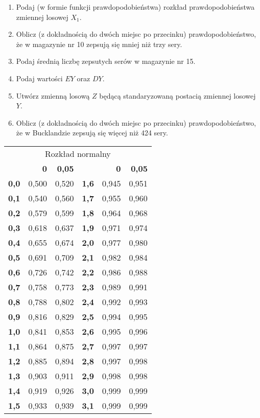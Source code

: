 \documentclass{mwart}
\begin{document}
\begin{enumerate}
\begin{enumerate}
\item Podaj  (w formie funkcji prawdopodobieństwa) rozkład prawdopodobieństwa zmiennej losowej $X_1$.
\item Oblicz (z dokładnością do dwóch miejsc po przecinku) prawdopodobieństwo, że w magazynie nr 10 zepsują się mniej niż trzy sery.
\item Podaj średnią liczbę zepsutych serów w magazynie nr 15.
\item Podaj wartości $EY$ oraz $DY$.
\item Utwórz zmienną losową $Z$ będącą standaryzowaną postacią zmiennej losowej $Y$.
\item Oblicz (z dokładnością do dwóch miejsc po przecinku) prawdopodobieństwo, że w Bucklandzie zepsują się więcej niż 424 sery.
\end{enumerate}


\begin{tabular}{|r|r|r||r|r|r|}
\hline
\multicolumn{6}{|c|}{Rozkład normalny} \\
	& \textbf{0}	& \textbf{0,05}	& 	& \textbf{0}	& \textbf{0,05}\\
\hline
\textbf{0,0}	& 0,500	& 0,520	& \textbf{1,6}	& 0,945	& 0,951 \\
\hline
\textbf{0,1}	& 0,540	& 0,560	& \textbf{1,7}	& 0,955	& 0,960 \\
\hline
\textbf{0,2}	& 0,579	& 0,599	& \textbf{1,8}	& 0,964	& 0,968 \\
\hline
\textbf{0,3}	& 0,618	& 0,637	& \textbf{1,9}	& 0,971	& 0,974 \\
\hline
\textbf{0,4}	& 0,655	& 0,674	& \textbf{2,0}	& 0,977	& 0,980 \\
\hline
\textbf{0,5}	& 0,691	& 0,709	& \textbf{2,1}	& 0,982	& 0,984 \\
\hline
\textbf{0,6}	& 0,726	& 0,742	& \textbf{2,2}	& 0,986	& 0,988 \\
\hline
\textbf{0,7}	& 0,758	& 0,773	& \textbf{2,3}	& 0,989	& 0,991 \\
\hline
\textbf{0,8}	& 0,788	& 0,802	& \textbf{2,4}	& 0,992	& 0,993 \\
\hline
\textbf{0,9}	& 0,816	& 0,829	& \textbf{2,5}	& 0,994	& 0,995 \\
\hline
\textbf{1,0}	& 0,841	& 0,853	& \textbf{2,6}	& 0,995	& 0,996 \\
\hline
\textbf{1,1}	& 0,864	& 0,875	& \textbf{2,7}	& 0,997	& 0,997 \\
\hline
\textbf{1,2}	& 0,885	& 0,894	& \textbf{2,8}	& 0,997	& 0,998 \\
\hline
\textbf{1,3}	& 0,903	& 0,911	& \textbf{2,9}	& 0,998	& 0,998 \\
\hline
\textbf{1,4}	& 0,919	& 0,926	& \textbf{3,0}	& 0,999	& 0,999 \\
\hline
\textbf{1,5}	& 0,933	& 0,939	& \textbf{3,1}	& 0,999	& 0,999 \\
\hline
\end{tabular}
\end{enumerate}
\end{document}
